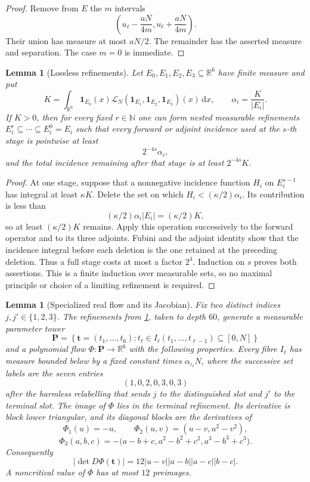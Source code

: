 \documentclass[11pt]{article}
\newtheorem{lemma}[theorem]{Lemma}
\newcommand{\R}{\mathbb{R}}
\newcommand{\N}{\mathbb{N}}
\newcommand{\dd}{\,\mathrm{d}}
\newcommand{\one}{\mathbf{1}}
\newcommand{\abs}[1]{\left|#1\right|}
\newcommand{\set}[1]{\left\{#1\right\}}
\newcommand{\indices}{\{1,2,3\}}
\begin{document}
	\begin{proof}
		Remove from \(E\) the \(m\) intervals
		\[
		\left(u_\ell-\frac{aN}{4m},u_\ell+\frac{aN}{4m}\right).
		\]
		Their union has measure at most \(aN/2\).  The remainder has the asserted measure and separation.  The case \(m=0\) is immediate.
	\end{proof}
	
	\begin{lemma}[Lossless refinements]\label{lem:lossless-refinements}
		Let \(E_0,E_1,E_2,E_3\subseteq\R^6\) have finite measure and put
		\[
		K=\int_{\R^6}\one_{E_0}(x)\mathcal L_N(\one_{E_1},\one_{E_2},\one_{E_3})(x)\dd x,
		\qquad
		\alpha_i=\frac{K}{\abs{E_i}}.
		\]
		If \(K>0\), then for every fixed \(r\in\N\) one can form nested measurable refinements
		\(E_i^r\subseteq\cdots\subseteq E_i^0=E_i\) such that every forward or adjoint incidence used at the \(s\)-th stage is pointwise at least
		\[
		2^{-4s}\alpha_i,
		\]
		and the total incidence remaining after that stage is at least \(2^{-4s}K\).
	\end{lemma}
	
	\begin{proof}
		At one stage, suppose that a nonnegative incidence function \(H_i\) on \(E_i^{s-1}\) has integral at least \(\kappa K\).  Delete the set on which
		\(H_i<(\kappa/2)\alpha_i\).  Its contribution is less than
		\[
		(\kappa/2)\alpha_i\abs{E_i}=(\kappa/2)K,
		\]
		so at least \((\kappa/2)K\) remains.  Apply this operation successively to the forward operator and to its three adjoints.  Fubini and the adjoint identity show that the incidence integral before each deletion is the one retained at the preceding deletion.  Thus a full stage costs at most a factor \(2^4\).  Induction on \(s\) proves both assertions.  This is a finite induction over measurable sets, so no maximal principle or choice of a limiting refinement is required.
	\end{proof}
	
	\begin{lemma}[Specialized real flow and its Jacobian]\label{lem:real-flow-jacobian}
		Fix two distinct indices \(j,j'\in\indices\).  The refinements from
		\cref{lem:lossless-refinements}, taken to depth \(60\), generate a measurable parameter tower
		\[
		\mathbf P=\set{\mathbf t=(t_1,\ldots,t_6):
			t_\ell\in I_\ell(t_1,\ldots,t_{\ell-1})\subseteq[0,N]}
		\]
		and a polynomial flow \(\Phi:\mathbf P\to\R^6\) with the following properties.
		Every fibre \(I_\ell\) has measure bounded below by a fixed constant times
		\(\alpha_{\iota_\ell}N\), where the successive set labels are the seven entries
		\[
		(1,0,2,0,3,0,3)
		\]
		after the harmless relabelling that sends \(j\) to the distinguished slot and \(j'\) to the terminal slot.  The image of \(\Phi\) lies in the terminal refinement.  Its derivative is block lower triangular, and its diagonal blocks are the derivatives of
		\[
		\Phi_1(u)=-u,
		\qquad
		\Phi_2(u,v)=(u-v,u^2-v^2),
		\]
		\[
		\Phi_3(a,b,c)=
		-\bigl(a-b+c,a^2-b^2+c^2,a^3-b^3+c^3\bigr).
		\]
		Consequently
		\[
		\abs{\det D\Phi(\mathbf t)}
		=
		12\abs{u-v}\abs{a-b}\abs{a-c}\abs{b-c}.
		\]
		A noncritical value of \(\Phi\) has at most \(12\) preimages.
	\end{lemma}
	
\end{document}
